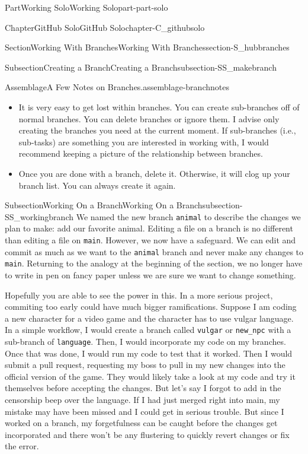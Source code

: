 \documentclass[oneside,10pt,]{book}
\newcommand{\mono}[1]{\texttt{#1}}
\begin{document}
\begin{partptx}{Part}{Working Solo}{}{Working Solo}{}{}{part-part-solo}
\begin{chapterptx}{Chapter}{GitHub Solo}{}{GitHub Solo}{}{}{chapter-C_githubsolo}
\begin{sectionptx}{Section}{Working With Branches}{}{Working With Branches}{}{}{section-S_hubbranches}
\begin{subsectionptx}{Subsection}{Creating a Branch}{}{Creating a Branch}{}{}{subsection-SS_makebranch}
\begin{assemblage}{Assemblage}{A Few Notes on Branches.}{assemblage-branchnotes}
\begin{itemize}[label=\textbullet]
\item{}It is very easy to get lost within branches. You can create sub-branches off of normal branches. You can delete branches or ignore them. I advise only creating the branches you need at the current moment. If sub-branches (i.e., sub-tasks) are something you are interested in working with, I would recommend keeping a picture of the relationship between branches.%
\item{}Once you are done with a branch, delete it. Otherwise, it will clog up your branch list. You can always create it again.%
\end{itemize}
%
\end{assemblage}
\end{subsectionptx}
%
%
\typeout{************************************************}
\typeout{************************************************}
%
\begin{subsectionptx}{Subsection}{Working On a Branch}{}{Working On a Branch}{}{}{subsection-SS_workingbranch}
%
We named the new branch \mono{animal} to describe the changes we plan to make: add our favorite animal. Editing a file on a branch is no different than editing a file on \mono{main}. However, we now have a safeguard. We can edit and commit as much as we want to the \mono{animal} branch and never make any changes to \mono{main}. Returning to the analogy at the beginning of the section, we no longer have to write in pen on fancy paper unless we are sure we want to change something.%
\par
Hopefully you are able to see the power in this. In a more serious project, commiting too early could have much bigger ramifications. Suppose I am coding a new character for a video game and the character has to use vulgar language. In a simple workflow, I would create a branch called \mono{vulgar} or \mono{new\_npc} with a sub-branch of \mono{language}. Then, I would incorporate my code on my branches. Once that was done, I would run my code to test that it worked. Then I would submit a pull request, requesting my boss to pull in my new changes into the official version of the game. They would likely take a look at my code and try it themselves before accepting the changes. But let's say I forgot to add in the censorship beep over the language. If I had just merged right into main, my mistake may have been missed and I could get in serious trouble. But since I worked on a branch, my forgetfulness can be caught before the changes get incorporated and there won't be any flustering to quickly revert changes or fix the error.%

\end{subsectionptx}
\end{sectionptx}
\end{chapterptx}
\end{partptx}
\end{document}
